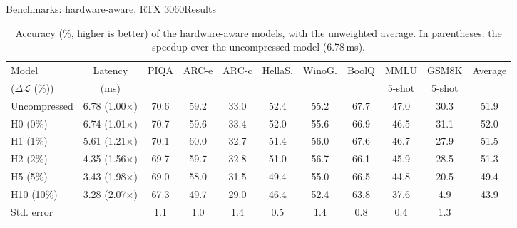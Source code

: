 \documentclass[aspectratio=169,10pt]{beamer}
\newcommand{\dloss}{\Delta\mathcal{L}}
\begin{document}
\begin{frame}{Benchmarks: hardware-aware, RTX 3060}{Results}
\begin{table}
\centering
\begin{adjustbox}{width=\linewidth, totalheight=0.64\textheight, keepaspectratio, center}
\centering
\small
\setlength{\tabcolsep}{3pt}
\begin{tabular}{lcccccccccc}
\toprule
Model & Latency & PIQA & ARC-e & ARC-c & HellaS. & WinoG. & BoolQ & MMLU & GSM8K & Average \\
($\dloss$ (\%)) & (ms)   &      &       &       &         &        &       & 5-shot & 5-shot & \\
\midrule
Uncompressed & 6.78 (1.00$\times$) & 70.6 & 59.2 & 33.0 & 52.4 & 55.2 & 67.7 & 47.0 & 30.3 & 51.9 \\
\addlinespace
H0  (0\%)    & 6.74 (1.01$\times$) & 70.7 & 59.6 & 33.4 & 52.0 & 55.6 & 66.9 & 46.5 & 31.1 & 52.0 \\
H1  (1\%)    & 5.61 (1.21$\times$) & 70.1 & 60.0 & 32.7 & 51.4 & 56.0 & 67.6 & 46.7 & 27.9 & 51.5 \\
H2  (2\%)    & 4.35 (1.56$\times$) & 69.7 & 59.7 & 32.8 & 51.0 & 56.7 & 66.1 & 45.9 & 28.5 & 51.3 \\
H5  (5\%)    & 3.43 (1.98$\times$) & 69.0 & 58.0 & 31.5 & 49.4 & 55.0 & 66.5 & 44.8 & 20.5 & 49.4 \\
H10 (10\%)   & 3.28 (2.07$\times$) & 67.3 & 49.7 & 29.0 & 46.4 & 52.4 & 63.8 & 37.6 &  4.9 & 43.9 \\
\midrule
Std. error   &      & 1.1  & 1.0  & 1.4  & 0.5  & 1.4  & 0.8  & 0.4  & 1.3  & \\
\bottomrule
\end{tabular}
\end{adjustbox}
\caption{Accuracy (\%, higher is better) of the hardware-aware models, with the unweighted average. In parentheses: the speedup over the uncompressed model (6.78\,ms).}\label{tab:hwresults}
\end{table}
\end{frame}
\end{document}
